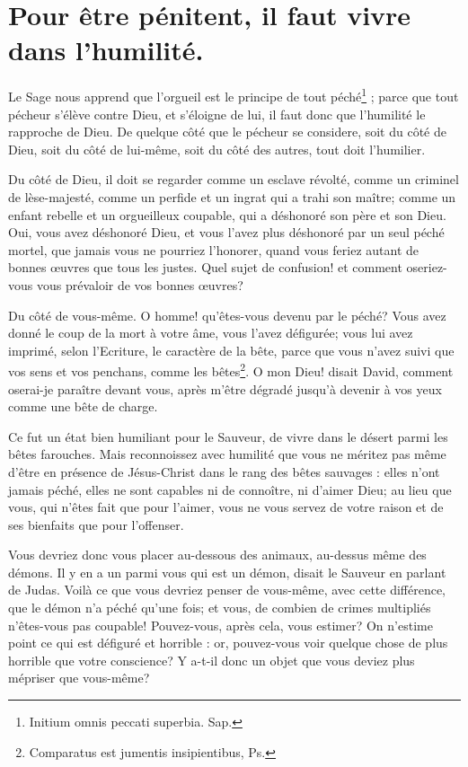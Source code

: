 \documentclass[instructions.tex]{subfiles}
\begin{document}
 
\chapter{Pour être pénitent, il faut vivre dans l'humilité.}
 
Le Sage nous apprend que l’orgueil est le principe de tout péché\footnote{Initium omnis peccati superbia. Sap.} ; parce que tout pécheur s’élève contre Dieu, et s’éloigne de lui, il faut donc que l’humilité le rapproche de Dieu. De quelque côté que le pécheur se considere, soit du côté de Dieu, soit du côté de lui-même, soit du côté des autres, tout doit l’humilier.
 
\primo Du côté de Dieu, il doit se regarder comme un esclave révolté, comme un criminel de lèse-majesté, comme un perfide et un ingrat qui a trahi son maître; comme un enfant rebelle et un orgueilleux coupable, qui a déshonoré son père et son Dieu. Oui, vous avez déshonoré Dieu, et vous l’avez plus déshonoré par un seul péché mortel, que jamais vous ne pourriez l’honorer, quand vous feriez autant de bonnes œuvres que tous les justes. Quel sujet de confusion! et comment oseriez-vous vous prévaloir de vos bonnes œuvres?
 
\secundo Du côté de vous-même. O homme! qu’êtes-vous devenu par le péché? Vous avez donné le coup de la mort à votre âme, vous l’avez défigurée; vous lui avez imprimé, selon l’Ecriture, le caractère de la bête, parce que vous n’avez suivi que vos sens et vos penchans, comme les bêtes\footnote{Comparatus est jumentis insipientibus, Ps.}. O mon Dieu! disait David, comment oserai-je paraître devant vous, après m’être dégradé jusqu’à devenir à vos yeux comme une bête de charge.
 
Ce fut un état bien humiliant pour le Sauveur, de vivre dans le désert parmi les bêtes farouches. Mais reconnoissez avec humilité que vous ne méritez pas même d’être en présence de Jésus-Christ dans le rang des bêtes sauvages : elles n’ont jamais péché, elles ne sont capables ni de connoître, ni d’aimer Dieu; au lieu que vous, qui n’êtes fait que pour l’aimer, vous ne vous servez de votre raison et de ses bienfaits que pour l’offenser.
 
Vous devriez donc vous placer au-dessous des animaux, au-dessus même des démons. Il y en a un parmi vous qui est un démon, disait le Sauveur en parlant de Judas. Voilà ce que vous devriez penser de vous-même, avec cette différence, que le démon n’a péché qu’une fois; et vous, de combien de crimes multipliés n’êtes-vous pas coupable! Pouvez-vous, après cela, vous estimer? On n’estime point ce qui est défiguré et horrible : or, pouvez-vous voir quelque chose de plus horrible que votre conscience? Y a-t-il donc un objet que vous deviez plus mépriser que vous-même?
 
\end{document}
